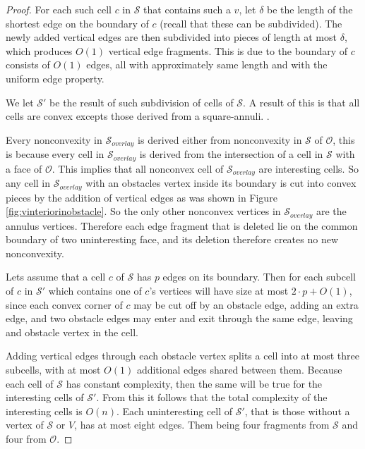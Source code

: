 \begin{proof}
For each such cell $c$ in $\mathcal{S}$ that contains such a $v$, let $\delta$ be the 
length of the shortest edge on the boundary of $c$ (recall that these can be subdivided). 
The newly added vertical edges are then subdivided into pieces of length at most $\delta$, 
which produces $O(1)$ vertical edge fragments. This is due to the boundary of $c$ consists 
of $O(1)$ edges, all with approximately same length and with the uniform edge property. 

We let $\mathcal{S}'$ be the result of such subdivision of cells of $\mathcal{S}$. A 
result of this is that all cells are convex excepts those derived from a square-annuli. 
. 

Every nonconvexity in $\mathcal{S}_{overlay}$ is derived either from nonconvexity in 
$\mathcal{S}$ of $\mathcal{O}$, this is because every cell in $\mathcal{S}_{overlay}$ is 
derived from the intersection of a cell in $\mathcal{S}$ with a face of $\mathcal{O}$. 
This implies that all nonconvex cell of $\mathcal{S}_{overlay}$ are interesting cells. So 
any cell in $\mathcal{S}_{overlay}$ with an obstacles vertex inside its boundary is cut 
into convex pieces by the addition of vertical edges as was shown in Figure 
\ref{fig:vinteriorinobstacle}. So the only other nonconvex vertices in 
$\mathcal{S}_{overlay}$ are the annulus vertices. Therefore each edge fragment that is 
deleted lie on the common boundary of two uninteresting face, and its deletion therefore 
creates no new nonconvexity. 

Lets assume that a cell $c$ of $\mathcal{S}$ has $p$ edges on its boundary. Then for each 
subcell of $c$ in $\mathcal{S}'$ which contains one of $c$'s vertices will have size at most 
$2\cdot p + O(1)$, since each convex corner of $c$ may be cut off by an obstacle edge, adding 
an extra edge, and two obstacle edges may enter and exit through the same edge, leaving and 
obstacle vertex in the cell. 

Adding vertical edges through each obstacle vertex splits a cell into at most three subcells, 
with at most $O(1)$ additional edges shared between them. Because each cell of $\mathcal{S}$ 
has constant complexity, then the same will be true for the interesting cells of 
$\mathcal{S}'$. From this it follows that the total complexity of the interesting cells is 
$O(n)$. Each uninteresting cell of $\mathcal{S}'$, that is those without a vertex of 
$\mathcal{S}$ or $V$, has at most eight edges. Them being four fragments from 
$\mathcal{S}$ and four from $\mathcal{O}$. 


\end{proof}
